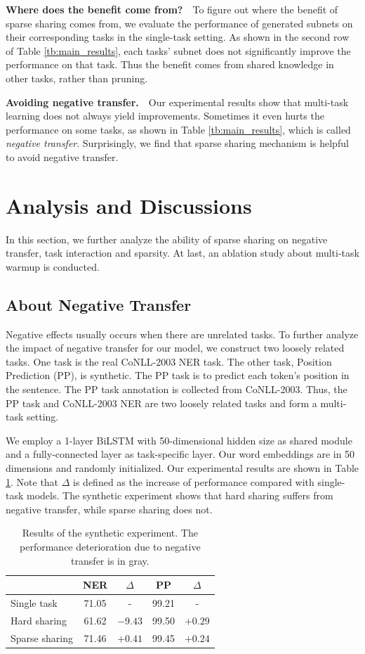 \documentclass[letterpaper]{article} %
\begin{document}
\textbf{Where does the benefit come from?}\ \ To figure out where the benefit of sparse sharing comes from, we evaluate the performance of generated subnets on their corresponding tasks in the single-task setting. As shown in the second row of Table \ref{tb:main_results}, each tasks' subnet does not significantly improve the performance on that task. Thus the benefit comes from shared knowledge in other tasks, rather than pruning.

\textbf{Avoiding negative transfer.}\ \ Our experimental results show that multi-task learning does not always yield improvements. Sometimes it even hurts the performance on some tasks, as shown in Table \ref{tb:main_results}, which is called \textit{negative transfer}. Surprisingly, we find that sparse sharing mechanism is helpful to avoid negative transfer.

\section{Analysis and Discussions}
In this section, we further analyze the ability of sparse sharing on negative transfer, task interaction and sparsity. At last, an ablation study about multi-task warmup is conducted.

\subsection{About Negative Transfer}
Negative effects usually occurs when there are unrelated tasks. To further analyze the impact of negative transfer for our model, we construct two loosely related tasks. One task is the real CoNLL-2003 NER task. The other task, Position Prediction (PP), is synthetic. The PP task is to predict each token's position in the sentence. The PP task annotation is collected from CoNLL-2003. Thus, the PP task and CoNLL-2003 NER are two loosely related tasks and form a multi-task setting.

We employ a 1-layer BiLSTM with 50-dimensional hidden size as shared module and a fully-connected layer as task-specific layer. Our word embeddings are in 50 dimensions and randomly initialized. Our experimental results are shown in Table \ref{tb:task_rel}. Note that $\Delta$ is defined as the increase of performance compared with single-task models. The synthetic experiment shows that hard sharing suffers from negative transfer, while sparse sharing does not.

\begin{table}[htbp]
\centering
\begin{tabular}{l|cc|cc}
\toprule
 & NER & $\Delta$ & PP & $\Delta$ \\ \midrule
Single task & 71.05 & - & 99.21 & - \\
Hard sharing & {\cellcolor[HTML]{D6D6D6}61.62} & {\cellcolor[HTML]{D6D6D6} $-9.43$} & 99.50 & $+0.29$ \\
Sparse sharing & 71.46 & $+0.41$ & 99.45 & $+0.24$ \\ \bottomrule
\end{tabular}
\caption{Results of the synthetic experiment. The performance deterioration due to negative transfer is in gray.}
\label{tb:task_rel}
\end{table}
\end{document}
